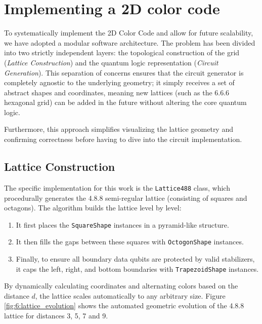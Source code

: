 \section{Implementing a 2D color code}
\label{sec:implementation_color_code}

To systematically implement the 2D Color Code and allow for future scalability, we have adopted a modular software architecture. The problem has been divided into two strictly independent layers: the topological construction of the grid (\textit{Lattice Construction}) and the quantum logic representation (\textit{Circuit Generation}). This separation of concerns ensures that the circuit generator is completely agnostic to the underlying geometry; it simply receives a set of abstract shapes and coordinates, meaning new lattices (such as the 6.6.6 hexagonal grid) can be added in the future without altering the core quantum logic.

Furthermore, this approach simplifies visualizing the lattice geometry and confirming correctness before having to dive into the circuit implementation.

\subsection{Lattice Construction}
The specific implementation for this work is the \texttt{Lattice488} class, which procedurally generates the 4.8.8 semi-regular lattice (consisting of squares and octagons). The algorithm builds the lattice level by level:
\begin{enumerate}
    \item It first places the \texttt{SquareShape} instances in a pyramid-like structure.
    \item It then fills the gaps between these squares with \texttt{OctogonShape} instances.
    \item Finally, to ensure all boundary data qubits are protected by valid stabilizers, it caps the left, right, and bottom boundaries with \texttt{TrapezoidShape} instances.
\end{enumerate}

By dynamically calculating coordinates and alternating colors based on the distance $d$, the lattice scales automatically to any arbitrary size. Figure \ref{fig:6:lattice_evolution} shows the automated geometric evolution of the 4.8.8 lattice for distances 3, 5, 7 and 9.

